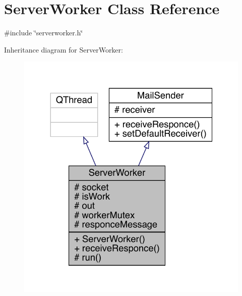 \hypertarget{a00185}{}\section{Server\+Worker Class Reference}
\label{a00185}


{\ttfamily \#include \char`\"{}serverworker.\+h\char`\"{}}



Inheritance diagram for Server\+Worker\+:
\nopagebreak
\begin{figure}[H]
\begin{center}
\leavevmode
\includegraphics[width=324pt]{d2/d94/a00184}
\end{center}
\end{figure}


